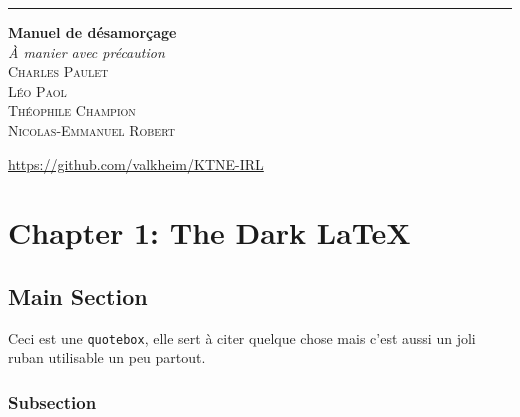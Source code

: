 \documentclass[letterpaper,12pt,openany]{extbook}
\begin{document}
\AddToShipoutPicture{\BackgroundPic}

\begin{titlepage} %

  \raggedleft %

  \rule{1pt}{\textheight} %
  \hspace{0.05\textwidth} %
  \parbox[b]{0.75\textwidth}{ %

    {\color{titlered}\Huge\bfseries Manuel de désamorçage}\\[2\baselineskip] %
    {\large\textit{À manier avec précaution}}\\[4\baselineskip] %
    {
      \textsc{Charles Paulet \\[0.5\baselineskip]
        Léo Paol \\[0.5\baselineskip]
        Théophile Champion \\[0.5\baselineskip]
        Nicolas-Emmanuel Robert
      }
    }

    \vspace{0.5\textheight} %

    {\noindent \url{https://github.com/valkheim/KTNE-IRL} }\\[\baselineskip]
  }

\end{titlepage}

\chapter{Chapter 1: The Dark \LaTeX}

\section{Main Section}
\lipsum[2] %

\begin{quotebox}
  Ceci est une \lstinline!quotebox!, elle sert à citer quelque chose mais
  c'est aussi un joli ruban utilisable un peu partout. 
\end{quotebox}

\subsection{Subsection}
\end{document}
